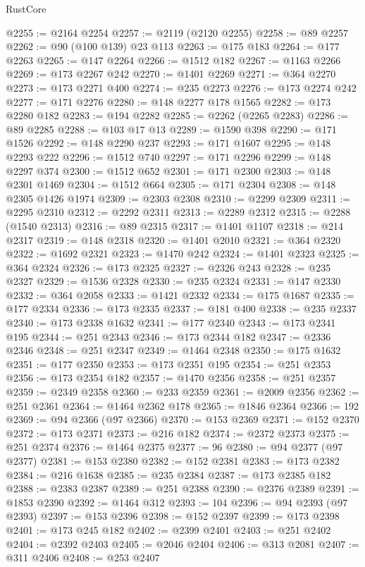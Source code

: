 \begin{lexlean}{RustCore}
\begin{coremodule}
@2255 := @2164 @2254
@2257 := @2119 (@2120 @2255)
@2258 := @89 @2257
@2262 := @90 (@100 @139) @23 @113
@2263 := @175 @183
@2264 := @177 @2263
@2265 := @147 @2264
@2266 := @1512 @182
@2267 := @1163 @2266
@2269 := @173 @2267 @242
@2270 := @1401 @2269
@2271 := @364 @2270
@2273 := @173 @2271 @400
@2274 := @235 @2273
@2276 := @173 @2274 @242
@2277 := @171 @2276
@2280 := @148 @2277 @178 @1565
@2282 := @173 @2280 @182
@2283 := @194 @2282
@2285 := @2262 (@2265 @2283)
@2286 := @89 @2285
@2288 := @103 @17 @13
@2289 := @1590 @398
@2290 := @171 @1526
@2292 := @148 @2290 @237
@2293 := @171 @1607
@2295 := @148 @2293 @222
@2296 := @1512 @740
@2297 := @171 @2296
@2299 := @148 @2297 @374
@2300 := @1512 @652
@2301 := @171 @2300
@2303 := @148 @2301 @1469
@2304 := @1512 @664
@2305 := @171 @2304
@2308 := @148 @2305 @1426 @1974
@2309 := @2303 @2308
@2310 := @2299 @2309
@2311 := @2295 @2310
@2312 := @2292 @2311
@2313 := @2289 @2312
@2315 := @2288 (@1540 @2313)
@2316 := @89 @2315
@2317 := @1401 @1107
@2318 := @214 @2317
@2319 := @148 @2318
@2320 := @1401 @2010
@2321 := @364 @2320
@2322 := @1692 @2321
@2323 := @1470 @242
@2324 := @1401 @2323
@2325 := @364 @2324
@2326 := @173 @2325
@2327 := @2326 @243
@2328 := @235 @2327
@2329 := @1536 @2328
@2330 := @235 @2324
@2331 := @147 @2330
@2332 := @364 @2058
@2333 := @1421 @2332
@2334 := @175 @1687
@2335 := @177 @2334
@2336 := @173 @2335
@2337 := @181 @400
@2338 := @235 @2337
@2340 := @173 @2338 @1632
@2341 := @177 @2340
@2343 := @173 @2341 @195
@2344 := @251 @2343
@2346 := @173 @2344 @182
@2347 := @2336 @2346
@2348 := @251 @2347
@2349 := @1464 @2348
@2350 := @175 @1632
@2351 := @177 @2350
@2353 := @173 @2351 @195
@2354 := @251 @2353
@2356 := @173 @2354 @182
@2357 := @1470 @2356
@2358 := @251 @2357
@2359 := @2349 @2358
@2360 := @233 @2359
@2361 := @2009 @2356
@2362 := @251 @2361
@2364 := @1464 @2362 @178
@2365 := @1846 @2364
@2366 := 192
@2369 := @94 @2366 (@97 @2366)
@2370 := @153 @2369
@2371 := @152 @2370
@2372 := @173 @2371
@2373 := @216 @182
@2374 := @2372 @2373
@2375 := @251 @2374
@2376 := @1464 @2375
@2377 := 96
@2380 := @94 @2377 (@97 @2377)
@2381 := @153 @2380
@2382 := @152 @2381
@2383 := @173 @2382
@2384 := @216 @1638
@2385 := @235 @2384
@2387 := @173 @2385 @182
@2388 := @2383 @2387
@2389 := @251 @2388
@2390 := @2376 @2389
@2391 := @1853 @2390
@2392 := @1464 @312
@2393 := 104
@2396 := @94 @2393 (@97 @2393)
@2397 := @153 @2396
@2398 := @152 @2397
@2399 := @173 @2398
@2401 := @173 @245 @182
@2402 := @2399 @2401
@2403 := @251 @2402
@2404 := @2392 @2403
@2405 := @2046 @2404
@2406 := @313 @2081
@2407 := @311 @2406
@2408 := @253 @2407

\end{coremodule}
\end{lexlean}
